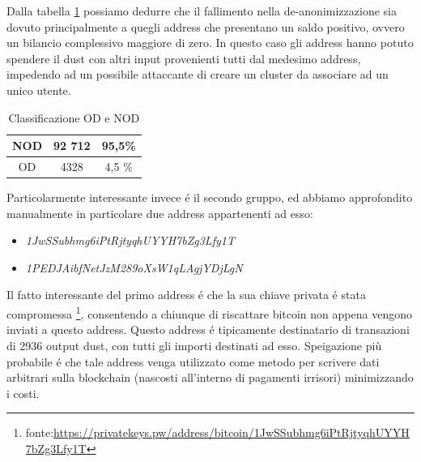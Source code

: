 Dalla tabella \ref{tab:OD_NOD_failed} possiamo dedurre che il fallimento nella de-anonimizzazione sia dovuto principalmente a quegli address che presentano un saldo positivo, ovvero un bilancio complessivo maggiore di zero. In questo caso gli address hanno potuto spendere il dust con altri input provenienti tutti dal medesimo address, impedendo ad un possibile attaccante di creare un cluster da associare ad un unico utente.
\begin{table}[H]
    \centering
    \begin{tabular}{|c|c|c|}
        \hline
            NOD  & 92 712 & 95,5\%\\
        \hline 
            OD  & 4328 & 4,5 \%\\
        \hline
    \end{tabular}
    \caption{Classificazione OD e NOD}
    \label{tab:OD_NOD_failed}
\end{table}
Particolarmente interessante invece é il secondo gruppo, ed abbiamo approfondito manualmente in particolare due address appartenenti ad esso:
\begin{itemize}
    \item \textit{1JwSSubhmg6iPtRjtyqhUYYH7bZg3Lfy1T}
    \item \textit{1PEDJAibfNetJzM289oXsW1qLAgjYDjLgN}
\end{itemize}

Il fatto interessante del primo address é che la sua chiave privata é stata compromessa \footnote{fonte:\url{https://privatekeys.pw/address/bitcoin/1JwSSubhmg6iPtRjtyqhUYYH7bZg3Lfy1T}}, consentendo a chiunque di riscattare bitcoin non appena vengono inviati a questo address. Questo address é tipicamente destinatario di transazioni di 2936 output dust, con tutti gli importi destinati ad esso. Speigazione più probabile é che tale address venga utilizzato come metodo per scrivere dati arbitrari sulla blockchain (nascosti all'interno di pagamenti irrisori) minimizzando i costi.

